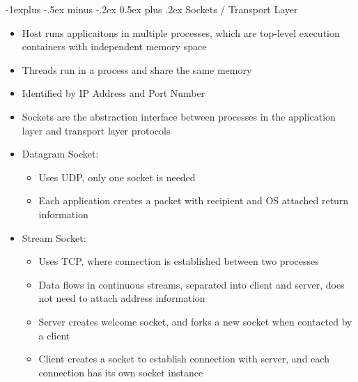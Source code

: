 \documentclass[10pt, landscape]{article}
\makeatletter
\renewcommand{\section}{\@startsection{section}{1}{0mm}%
                                {-1ex plus -.5ex minus -.2ex}%
                                {0.5ex plus .2ex}%
                                {\normalfont\large\bfseries}}
\renewcommand{\section}{\@startsection{section}{2}{0mm}%
                                {-1explus -.5ex minus -.2ex}%
                                {0.5ex plus .2ex}%
                                {\normalfont\normalsize\bfseries}}
\makeatother
\begin{document}
\begin{multicols*}{3}
\section{Sockets / Transport Layer}
\begin{itemize}
    \item Host runs applicaitons in multiple processes, which are top-level execution containers with independent memory space
    \item Threads run in a process and share the same memory
    \item Identified by IP Address and Port Number
    \item Sockets are the abstraction interface between processes in the application layer and transport layer protocols
    \item Datagram Socket:
    \begin{itemize}
        \item Uses UDP, only one socket is needed
        \item Each application creates a packet with recipient and OS attached return information
    \end{itemize}
    \item Stream Socket:
    \begin{itemize}
        \item Uses TCP, where connection is established between two processes
        \item Data flows in continuous streams, separated into client and server, does not need to attach address information
        \item Server creates welcome socket, and forks a new socket when contacted by a client
        \item Client creates a socket to establish connection with server, and each connection has its own socket instance
    \end{itemize}
\end{itemize}


\end{multicols*}
\end{document}
